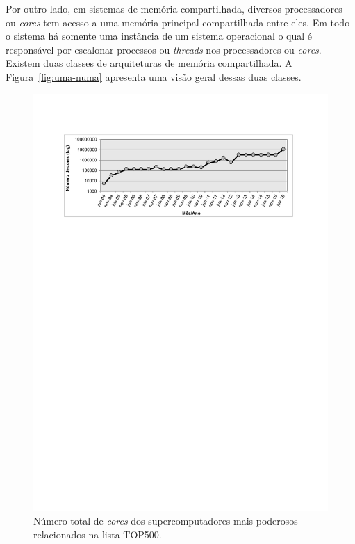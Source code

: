 \documentclass{SBCbookchapter}
\begin{document}
		Por outro lado, em sistemas de memória compartilhada, diversos processadores ou \textit{cores} tem acesso
		a uma memória principal compartilhada entre eles. Em todo o sistema há somente uma instância
		de um sistema operacional o qual é responsável por escalonar processos ou \textit{threads} nos
		processadores ou \textit{cores}. Existem duas classes de arquiteturas de memória compartilhada.
		A Figura~\ref{fig:uma-numa} apresenta uma visão geral dessas duas classes.

                        	\begin{figure}[t]
                        		\centering
                        		\includegraphics[width=13cm, height=!]{img/cores-top500.pdf}
                        		\caption{Número total de \textit{cores} dos supercomputadores
                        		mais poderosos relacionados na lista TOP500.}
                        		\label{fig:top500}
                        	\end{figure}
            
\end{document}
